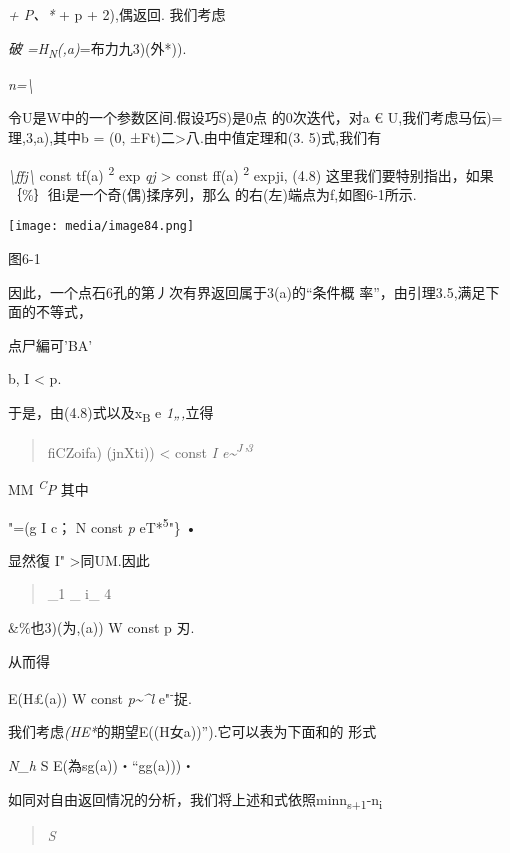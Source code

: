 \documentclass{article}
\begin{document}
\emph{+ P、*} + p + 2),偶返回. 我们考虑

\emph{破 =H\textsubscript{N}(,a)}=布力九3)(外*)).

\emph{n=\textbackslash{}}

令U是W中的一个参数区间.假设巧S)是0点 的0次迭代，对a €
U,我们考虑马伝)=理,3,a),其中b = (0,
±Ft)二\textgreater{}八.由中值定理和(3. 5)式,我们有

\emph{\textbackslash{}ffj\textbackslash{}} const \textbar{}tf(a)
\textbar{}\textsuperscript{2} exp \emph{qj} \textgreater{} const
\textbar{}ff(a) \textbar{}\textsuperscript{2} expji, (4.8)
这里我们要特别指出，如果｛\%｝徂i是一个奇(偶)揉序列，那么
的右(左)端点为f,如图6-1所示.

\texttt{[image: media/image84.png]}

图6-1

因此，一个点石6孔的第丿次有界返回属于3(a)的``条件概
率''，由引理3.5,满足下面的不等式，

点尸編可'BA'

b, I \textless{} p.

于是，由(4.8)式以及x\textsubscript{B} e \emph{1„,}立得

\begin{quote}
fiCZoifa) (jnXti)) \textless{} const \emph{I
e\textasciitilde{}\textsuperscript{J}'\textsuperscript{3}}
\end{quote}

MM \emph{\textsuperscript{C}P} 其中

"=(g I c； N const \emph{p} eT*\textsuperscript{5}"\} •

显然復\textbar{} I" \textgreater{}同UM.因此

\begin{quote}
\_1 \_ i\_ 4
\end{quote}

\&\%也3)(为,(a)) W const p 刃.

从而得

E(H£(a)) W const \emph{p\textasciitilde{}\^{}l} e"\textsuperscript{-}捉.

我们考虑\emph{(HE*}的期望E((H女a))'').它可以表为下面和的 形式

\emph{N\_h} S E(為sg(a))・``gg(a)))・

如同对自由返回情况的分析，我们将上述和式依照min\textbar{}n\textsubscript{s+1}-n\textsubscript{i}\textbar{}

\begin{quote}
\emph{S}
\end{quote}
\end{document}
